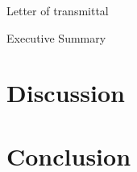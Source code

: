 \documentclass[12pt]{article}
\begin{document}
    Letter of transmittal

    \pagebreak

    

    Executive Summary

    \pagebreak

    \tableofcontents

    \pagebreak

    

    

    \section{Discussion}

    \pagebreak

    \section{Conclusion}

    \pagebreak

    
\end{document}
